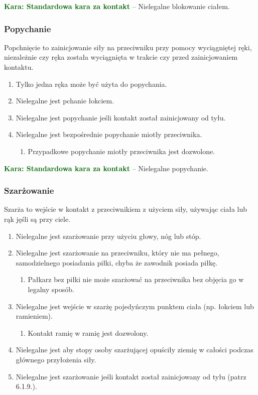 \documentclass[11pt,a4paper]{article}
\newcommand\penaltyd[2]{\bgroup\textcolor{darkgreen}{\textbf{Kara: #1}} -- #2}
\begin{document}
\penaltyd{Standardowa kara za kontakt}{Nielegalne blokowanie ciałem.}

\subsubsection{Popychanie}
Popchnięcie to zainicjowanie siły na przeciwniku przy pomocy wyciągniętej ręki, niezależnie czy ręka została wyciągnięta w trakcie czy przed zainicjowaniem kontaktu.
\begin{enumerate}
  \item Tylko jedna ręka może być użyta do popychania.
  \item Nielegalne jest pchanie łokciem.
  \item Nielegalne jest popychanie jeśli kontakt został zainicjowany od tyłu.
  \item Nielegalne jest bezpośrednie popychanie miotły przeciwnika.
  \begin{enumerate}
    \item Przypadkowe popychanie miotły przeciwnika jest dozwolone.
  \end{enumerate}
\end{enumerate}

\penaltyd{Standardowa kara za kontakt}{Nielegalne popychanie.}

\subsubsection{Szarżowanie}
Szarża to wejście w kontakt z przeciwnikiem z użyciem siły, używając ciała lub rąk jęśli są przy ciele.
\begin{enumerate}
  \item Nielegalne jest szarżowanie przy użyciu głowy, nóg lub stóp.
  \item Nielegalne jest szarżowanie na przeciwniku, który nie ma pełnego, samodzielnego posiadania piłki, chyba że zawodnik posiada piłkę.
  \begin{enumerate}
    \item Pałkarz bez piłki nie może szarżować na przeciwnika bez objęcia go w legalny sposób.
  \end{enumerate}
  \item Nielegalne jest wejście w szarżę pojedyńczym punktem ciała (np. łokciem lub ramieniem).
  \begin{enumerate}
    \item Kontakt ramię w ramię jest dozwolony.
  \end{enumerate}
  \item Nielegalne jest aby stopy osoby szarżującej opuściły ziemię w całości podczas głównego przyłożenia siły.
  \item Nielegalne jest szarżowanie jeśli kontakt został zainicjowany od tyłu (patrz 6.1.9.). %
\end{enumerate}
\end{document}
